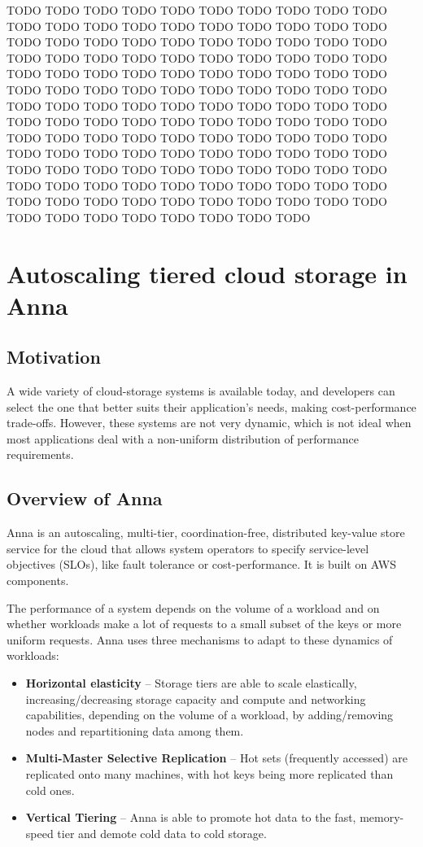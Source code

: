 \documentclass[14pt,oneside]{extreport}
\newcommand*\fpar{\hspace{1ex}}
\begin{document}
TODO TODO TODO TODO TODO TODO TODO TODO TODO TODO TODO TODO TODO TODO TODO TODO TODO TODO TODO TODO TODO TODO TODO TODO TODO TODO TODO TODO TODO TODO TODO TODO TODO TODO TODO TODO TODO TODO TODO TODO TODO TODO TODO TODO TODO TODO TODO TODO TODO TODO TODO TODO TODO TODO TODO TODO TODO TODO TODO TODO TODO TODO TODO TODO TODO TODO TODO TODO TODO TODO TODO TODO TODO TODO TODO TODO TODO TODO TODO TODO TODO TODO TODO TODO TODO TODO TODO TODO TODO TODO TODO TODO TODO TODO TODO TODO TODO TODO TODO TODO TODO TODO TODO TODO TODO TODO TODO TODO TODO TODO TODO TODO TODO TODO TODO TODO TODO TODO TODO TODO TODO TODO TODO TODO TODO TODO TODO TODO TODO TODO TODO TODO TODO TODO TODO TODO TODO TODO 

\chapter{Autoscaling tiered cloud storage in Anna \cite{paper2}}
  \section{Motivation}
  \fpar A wide variety of cloud-storage systems is available today, and developers can select the one that better suits their application’s needs, making cost-performance trade-offs. However, these systems are not very dynamic, which is not ideal when most applications deal with a non-uniform distribution of performance requirements.

  \section{Overview of Anna}
  \fpar Anna is an autoscaling, multi-tier, coordination-free, distributed key-value store service for the cloud that allows system operators to specify service-level objectives (SLOs), like fault tolerance or cost-performance. It is built on AWS components.
  \par The performance of a system depends on the volume of a workload and on whether workloads make a lot of requests to a small subset of the keys or more uniform requests. Anna uses three mechanisms to adapt to these dynamics of workloads:
  \begin{itemize}
    \item \textbf{Horizontal elasticity} – Storage tiers are able to scale elastically, increasing/decreasing storage capacity and compute and networking capabilities, depending on the volume of a workload, by adding/removing nodes and repartitioning data among them.
    \item \textbf{Multi-Master Selective Replication} – Hot sets (frequently accessed) are replicated onto many machines, with hot keys being more replicated than cold ones.
    \item \textbf{Vertical Tiering} – Anna is able to promote hot data to the fast, memory-speed tier and demote cold data to cold storage.
  \end{itemize}
\end{document}
